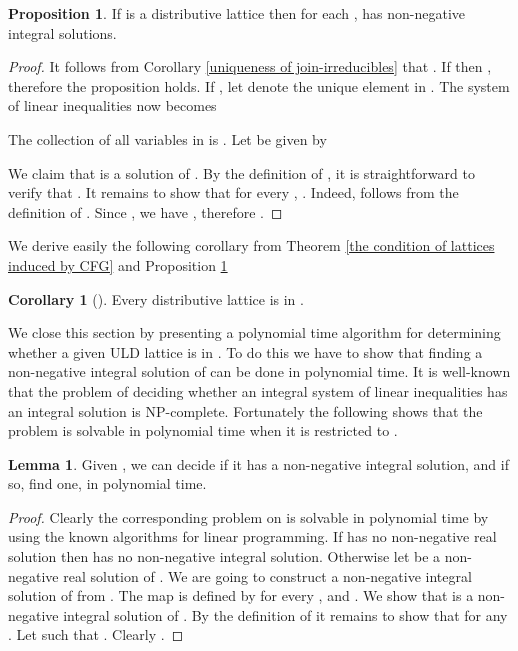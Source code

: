 \documentclass{article}
\theoremstyle{definition}
\newtheorem{lem}{Lemma}
\newtheorem{coro}{Corollary}
\newtheorem{prop}{Proposition}
\begin{document}
\begin{prop}
\label{lemma of the condition on distributive lattice}
If  is a distributive lattice then for each ,  has non-negative integral solutions.
\end{prop}
\begin{proof}
It follows from Corollary \ref{uniqueness of join-irreducibles} that . If  then , therefore the proposition holds. If ,  let  denote the unique element in . The system  of linear inequalities now becomes

The collection  of all variables in  is . Let  be given by


We claim that  is a solution of . By the definition of , it is straightforward to verify that . It remains to show that for every , . Indeed,  follows from the definition of . Since , we have , therefore .  
\end{proof}
We derive easily the following corollary from Theorem \ref{the condition of lattices induced by CFG} and Proposition \ref{lemma of the condition on distributive lattice}
\begin{coro}[\cite{MVP01}]Every distributive lattice is in .
\end{coro}
We close this section by presenting a polynomial time algorithm for determining whether a given ULD lattice is in . To do this we have to show that finding a non-negative integral solution of  can be done in polynomial time. It is well-known that the problem of deciding whether an integral system of linear inequalities has an integral solution is NP-complete. Fortunately the following shows that the problem is solvable in polynomial time when it is restricted to .
\begin{lem}
\label{find a solution}
Given , we can decide if it has a non-negative integral solution, and if so, find one, in polynomial time.
\end{lem}
\begin{proof}
Clearly the corresponding problem on  is solvable in polynomial time by using the known algorithms for linear programming. If  has no non-negative real solution then  has no non-negative integral solution. Otherwise let  be a non-negative real solution of . We are going to construct a non-negative integral solution  of  from . The map  is defined by  for every , and . We show that  is a non-negative integral solution of . By the definition of  it remains to show that  for any . Let  such that . Clearly .
\end{proof}
\end{document}
